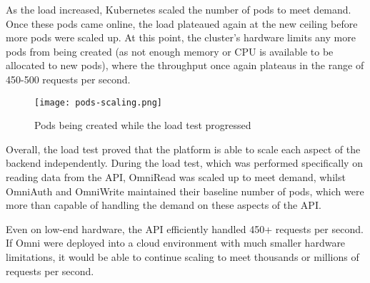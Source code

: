 As the load increased, Kubernetes scaled the number of pods to meet demand. Once these pods came online, the load plateaued again at the new ceiling before more pods were scaled up.
At this point, the cluster's hardware limits any more pods from being created (as not enough memory or CPU is available to be allocated to new pods), where the throughput once again plateaus in the range of 450-500 requests per second. 

\begin{figure}[htbp]
\texttt{[image: pods-scaling.png]}
\centering
\caption{Pods being created while the load test progressed}
\label{fig:load-test-pods-scaling}
\end{figure}

Overall, the load test proved that the platform is able to scale each aspect of the backend independently.
During the load test, which was performed specifically on reading data from the API, OmniRead was scaled up to meet demand, whilst OmniAuth and OmniWrite maintained their baseline number of pods, which were more than capable of handling the demand on these aspects of the API. 

Even on low-end hardware, the API efficiently handled 450+ requests per second.
If Omni were deployed into a cloud environment with much smaller hardware limitations, it would be able to continue scaling to meet thousands or millions of requests per second.
